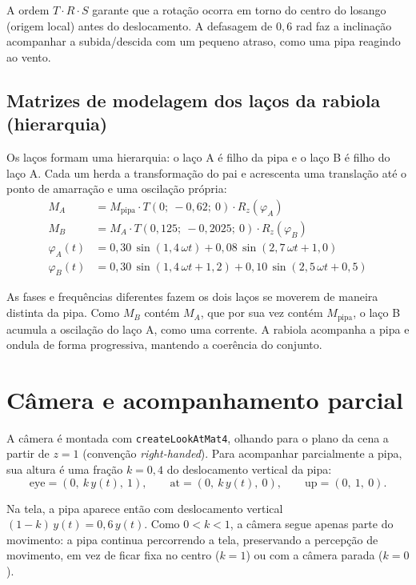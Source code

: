 \documentclass[11pt,a4paper]{article}
\newcommand{\code}[1]{\texttt{#1}}
\begin{document}
A ordem $T\cdot R\cdot S$ garante que a rotação ocorra em torno do centro do
losango (origem local) antes do deslocamento. A defasagem de $0{,}6$ rad faz a
inclinação acompanhar a subida/descida com um pequeno atraso, como uma pipa
reagindo ao vento.

\subsection{Matrizes de modelagem dos laços da rabiola (hierarquia)}

Os laços formam uma hierarquia: o laço A é filho da pipa e o laço B é filho do
laço A. Cada um herda a transformação do pai e acrescenta uma translação até o
ponto de amarração e uma oscilação própria:
\begin{align*}
    M_A &= M_{\text{pipa}} \cdot T(0;\ -0{,}62;\ 0) \cdot R_z(\varphi_A)\\
    M_B &= M_A \cdot T(0{,}125;\ -0{,}2025;\ 0) \cdot R_z(\varphi_B)\\[2pt]
    \varphi_A(t) &= 0{,}30\,\sin(1{,}4\,\omega t) + 0{,}08\,\sin(2{,}7\,\omega t + 1{,}0)\\
    \varphi_B(t) &= 0{,}30\,\sin(1{,}4\,\omega t + 1{,}2) + 0{,}10\,\sin(2{,}5\,\omega t + 0{,}5)
\end{align*}

As fases e frequências diferentes fazem os dois laços se moverem de maneira
distinta da pipa. Como $M_B$ contém $M_A$, que por sua vez contém
$M_{\text{pipa}}$, o laço B acumula a oscilação do laço A, como uma corrente.
A rabiola acompanha a pipa e ondula de forma progressiva, mantendo a coerência
do conjunto.

\section{Câmera e acompanhamento parcial}

A câmera é montada com \code{createLookAtMat4}, olhando para o plano da cena a
partir de $z=1$ (convenção \emph{right-handed}). Para acompanhar parcialmente
a pipa, sua altura é uma fração $k = 0{,}4$ do deslocamento vertical da pipa:
\[
    \text{eye} = (0,\ k\,y(t),\ 1),\qquad
    \text{at}  = (0,\ k\,y(t),\ 0),\qquad
    \text{up}  = (0,\ 1,\ 0).
\]

Na tela, a pipa aparece então com deslocamento vertical
$(1-k)\,y(t) = 0{,}6\,y(t)$. Como $0 < k < 1$, a câmera segue apenas parte do
movimento: a pipa continua percorrendo a tela, preservando a percepção de
movimento, em vez de ficar fixa no centro ($k=1$) ou com a câmera parada
($k=0$).
\end{document}
